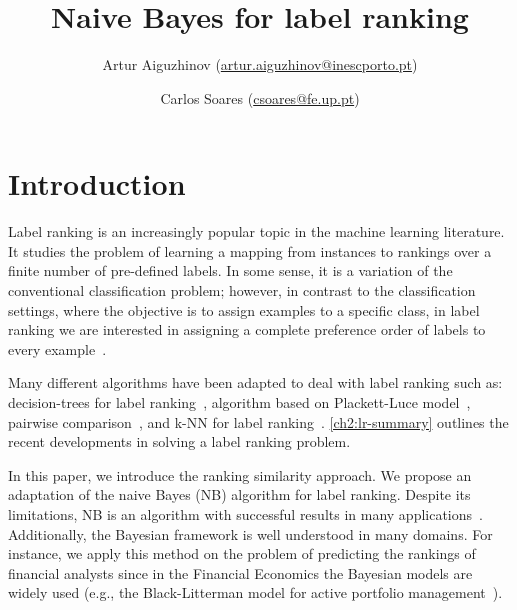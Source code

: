 \documentclass[12pt, a4paper]{article}\usepackage[]{graphicx}\usepackage[]{color}
\begin{document}
\onehalfspacing
\listoftables
\listoffigures
\tableofcontents


\doublespace

\title{Naive Bayes for label ranking}
 \author[1,2]{ Artur Aiguzhinov (\href{mailto:artur.aiguzhinov@inescporto.pt}{artur.aiguzhinov@inescporto.pt})}
 \author[2,3]{Carlos Soares (\href{mailto:csoares@fe.up.pt}{csoares@fe.up.pt})}



\maketitle
\begin{abstract}

\end{abstract}








\section{Introduction}
Label ranking is an increasingly popular topic in the machine learning literature. It studies the problem of learning a mapping from instances to rankings over a finite number of pre-defined labels. In some sense, it is a variation of the conventional classification problem; however, in contrast to the classification settings, where the objective is to assign examples to a specific class, in label ranking we are interested in assigning a complete preference order of labels to every example~\citep{cheng2009}.

Many different algorithms have been adapted to deal with label ranking such as: decision-trees for label ranking~\citep{cheng2009}, algorithm based on Plackett-Luce model~\citep{cheng2010}, pairwise comparison~\citep{hullermeier}, and k-NN for label ranking~\citep{brazdil2003}. \ref{ch2:lr-summary} outlines the recent developments in solving a label ranking problem.

In this paper, we introduce the ranking similarity approach. We propose an adaptation of the naive Bayes (NB) algorithm for label ranking. Despite its limitations, NB is an algorithm with successful results in many applications~\citep{domingos1997}. Additionally, the Bayesian framework is well understood in many domains. For instance, we apply this method on the problem of predicting the rankings of financial analysts since in the Financial Economics the Bayesian models are widely used (e.g., the Black-Litterman model for active portfolio management~\citep{black1992}).
\end{document}
